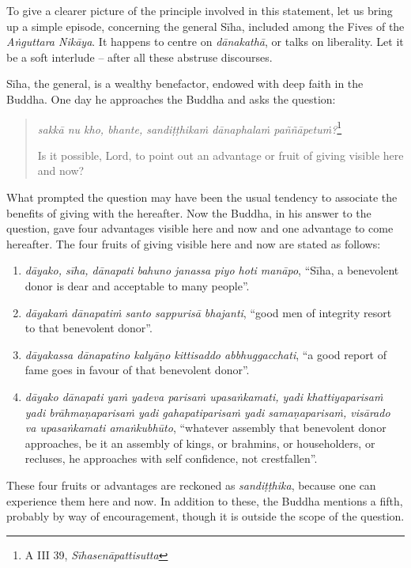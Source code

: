 To give a clearer picture of the principle involved in this statement, let us bring up a simple episode, concerning the general Sīha, included among the Fives of the \emph{Aṅguttara Nikāya}. It happens to centre on \emph{dānakathā}, or talks on liberality. Let it be a soft interlude -- after all these abstruse discourses.

Sīha, the general, is a wealthy benefactor, endowed with deep faith in the Buddha. One day he approaches the Buddha and asks the question:

\clearpage

\begin{quote}
\emph{sakkā nu kho, bhante, sandiṭṭhikaṁ dānaphalaṁ paññāpetuṁ?}\footnote{A III 39, \emph{Sīhasenāpattisutta}}

Is it possible, Lord, to point out an advantage or fruit of giving visible here and now?
\end{quote}

What prompted the question may have been the usual tendency to associate the benefits of giving with the hereafter. Now the Buddha, in his answer to the question, gave four advantages visible here and now and one advantage to come hereafter. The four fruits of giving visible here and now are stated as follows:

\begin{enumerate}
\def\labelenumi{\arabic{enumi}.}
\tightlist
\item
  \emph{dāyako, sīha, dānapati bahuno janassa piyo hoti manāpo}, ``Sīha, a benevolent donor is dear and acceptable to many people''.
\item
  \emph{dāyakaṁ dānapatiṁ santo sappurisā bhajanti}, ``good men of integrity resort to that benevolent donor''.
\item
  \emph{dāyakassa dānapatino kalyāṇo kittisaddo abbhuggacchati}, ``a good report of fame goes in favour of that benevolent donor''.
\item
  \emph{dāyako dānapati yaṁ yadeva parisaṁ upasaṅkamati, yadi khattiyaparisaṁ yadi brāhmaṇaparisaṁ yadi gahapatiparisaṁ yadi samaṇaparisaṁ, visārado va upasaṅkamati amaṅkubhūto}, ``whatever assembly that benevolent donor approaches, be it an assembly of kings, or brahmins, or householders, or recluses, he approaches with self confidence, not crestfallen''.
\end{enumerate}

These four fruits or advantages are reckoned as \emph{sandiṭṭhika}, because one can experience them here and now. In addition to these, the Buddha mentions a fifth, probably by way of encouragement, though it is outside the scope of the question.

